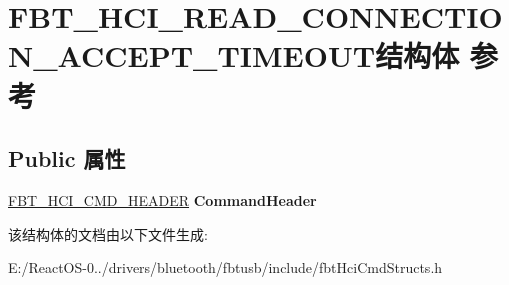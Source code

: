 \hypertarget{struct_f_b_t___h_c_i___r_e_a_d___c_o_n_n_e_c_t_i_o_n___a_c_c_e_p_t___t_i_m_e_o_u_t}{}\section{F\+B\+T\+\_\+\+H\+C\+I\+\_\+\+R\+E\+A\+D\+\_\+\+C\+O\+N\+N\+E\+C\+T\+I\+O\+N\+\_\+\+A\+C\+C\+E\+P\+T\+\_\+\+T\+I\+M\+E\+O\+U\+T结构体 参考}
\label{struct_f_b_t___h_c_i___r_e_a_d___c_o_n_n_e_c_t_i_o_n___a_c_c_e_p_t___t_i_m_e_o_u_t}
\subsection*{Public 属性}
\begin{DoxyCompactItemize}
\item 
\mbox{\label{struct_f_b_t___h_c_i___r_e_a_d___c_o_n_n_e_c_t_i_o_n___a_c_c_e_p_t___t_i_m_e_o_u_t_ad80803952d3e35cd256c068256116df0}} 
\hyperlink{struct_f_b_t___h_c_i___c_m_d___h_e_a_d_e_r}{F\+B\+T\+\_\+\+H\+C\+I\+\_\+\+C\+M\+D\+\_\+\+H\+E\+A\+D\+ER} {\bfseries Command\+Header}
\end{DoxyCompactItemize}


该结构体的文档由以下文件生成\+:\begin{DoxyCompactItemize}
\item 
E\+:/\+React\+O\+S-\/0../drivers/bluetooth/fbtusb/include/fbt\+Hci\+Cmd\+Structs.\+h\end{DoxyCompactItemize}
